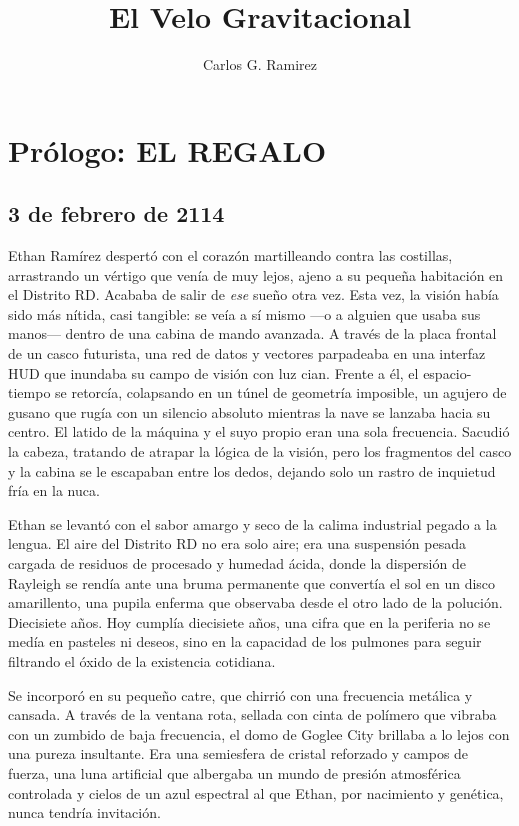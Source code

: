 \documentclass[11pt,twoside]{book}
\title{\textbf{El Velo Gravitacional}}
\author{Carlos G. Ramirez}
\date{} %
\begin{document}
\maketitle

\frontmatter
\tableofcontents

\mainmatter

\chapter*{Prólogo: EL REGALO}

\section*{3 de febrero de 2114}

Ethan Ramírez despertó con el corazón martilleando contra las costillas, arrastrando un vértigo que venía de muy lejos, ajeno a su pequeña habitación en el Distrito RD. Acababa de salir de \textit{ese} sueño otra vez. Esta vez, la visión había sido más nítida, casi tangible: se veía a sí mismo ---o a alguien que usaba sus manos--- dentro de una cabina de mando avanzada. A través de la placa frontal de un casco futurista, una red de datos y vectores parpadeaba en una interfaz HUD que inundaba su campo de visión con luz cian. Frente a él, el espacio-tiempo se retorcía, colapsando en un túnel de geometría imposible, un agujero de gusano que rugía con un silencio absoluto mientras la nave se lanzaba hacia su centro. El latido de la máquina y el suyo propio eran una sola frecuencia. Sacudió la cabeza, tratando de atrapar la lógica de la visión, pero los fragmentos del casco y la cabina se le escapaban entre los dedos, dejando solo un rastro de inquietud fría en la nuca.

Ethan se levantó con el sabor amargo y seco de la calima industrial pegado a la lengua. El aire del Distrito RD no era solo aire; era una suspensión pesada cargada de residuos de procesado y humedad ácida, donde la dispersión de Rayleigh se rendía ante una bruma permanente que convertía el sol en un disco amarillento, una pupila enferma que observaba desde el otro lado de la polución. Diecisiete años. Hoy cumplía diecisiete años, una cifra que en la periferia no se medía en pasteles ni deseos, sino en la capacidad de los pulmones para seguir filtrando el óxido de la existencia cotidiana.

Se incorporó en su pequeño catre, que chirrió con una frecuencia metálica y cansada. A través de la ventana rota, sellada con cinta de polímero que vibraba con un zumbido de baja frecuencia, el domo de Goglee City brillaba a lo lejos con una pureza insultante. Era una semiesfera de cristal reforzado y campos de fuerza, una luna artificial que albergaba un mundo de presión atmosférica controlada y cielos de un azul espectral al que Ethan, por nacimiento y genética, nunca tendría invitación.
\end{document}
